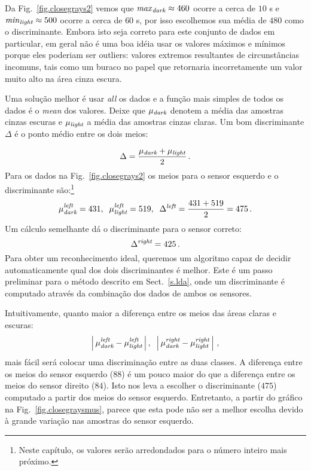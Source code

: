 Da Fig.~\ref{fig.closegrays2} vemos que $\mathit{max}_{\textit{\scriptsize dark}}\approx 460$ ocorre a cerca de $10$ s e $\mathit{min}_{\textit{\scriptsize light}}\approx 500$ ocorre a cerca de $60$ s, por isso escolhemos sua média de $480$ como o discriminante. Embora isto seja correto para este conjunto de dados em particular, em geral não é uma boa idéia usar os valores máximos e mínimos porque eles poderiam ser {outliers}: valores extremos resultantes de circunstâncias incomuns, tais como um buraco no papel que retornaria incorretamente um valor muito alto na área cinza escura.

Uma solução melhor é usar \emph{all} os dados e a função mais simples de todos os dados é o \emph{mean} dos valores. Deixe que $\mu_{\textit{\scriptsize dark}}$ denotem a média das amostras cinzas escuras e $\mu_{\textit{\scriptsize light}}$ a média das amostras cinzas claras. Um bom discriminante $\Delta$ é o ponto médio entre os dois meios:

\begin{displaymath}
\Delta = \frac{\mu_{\sub{dark}} + \mu_{\sub{light}}}{2}\,.%
\end{displaymath}
Para os dados na Fig.~\ref{fig.closegrays2} os meios para o sensor esquerdo e o discriminante são:\footnote{Neste capítulo, os valores serão arredondados para o número inteiro mais próximo.}
\[
\mu_{\textit{\scriptsize dark}}^{\textit{\scriptsize left}} = 431,\;\;
\mu_{\textit{\scriptsize light}}^{\textit{\scriptsize left}} = 519,\;\;
\Delta^{\textit{\scriptsize left}} = \frac{431+519}{2} = 475\,.
\]
Um cálculo semelhante dá o discriminante para o sensor correto:
\[
\Delta^{\textit{\scriptsize right}} = 425\,.
\]
Para obter um reconhecimento ideal, queremos um algoritmo capaz de decidir automaticamente qual dos dois discriminantes é melhor. Este é um passo preliminar para o método descrito em Sect.~\ref{s.lda}, onde um discriminante é computado através da combinação dos dados de ambos os sensores.

Intuitivamente, quanto maior a diferença entre os meios das áreas claras e escuras:
\[
\left|\,\mu_{\textit{\scriptsize dark}}^{\textit{\scriptsize left}} - \mu_{\textit{\scriptsize light}}^{\textit{\scriptsize left}}\,\right|,\;\;\left|\,\mu_{\textit{\scriptsize dark}}^{\textit{\scriptsize right}} - \mu_{\textit{\scriptsize light}}^{\textit{\scriptsize right}}\,\right|\,,
\]
mais fácil será colocar uma discriminação entre as duas classes. A diferença entre os meios do sensor esquerdo ($88$) é um pouco maior do que a diferença entre os meios do sensor direito ($84$). Isto nos leva a escolher o discriminante ($475$) computado a partir dos meios do sensor esquerdo. Entretanto, a partir do gráfico na Fig.~\ref{fig.closegraysmus}, parece que esta pode não ser a melhor escolha devido à grande variação nas amostras do sensor esquerdo.


